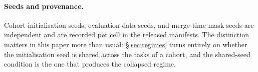 \paragraph{Seeds and provenance.} Cohort initialisation seeds, evaluation
data seeds, and merge-time mask seeds are independent and are recorded
per cell in the released manifests. The distinction matters in this paper
more than usual: \S\ref{sec:regimes} turns entirely on whether the
initialisation seed is shared across the tasks of a cohort, and the
shared-seed condition is the one that produces the collapsed regime.

